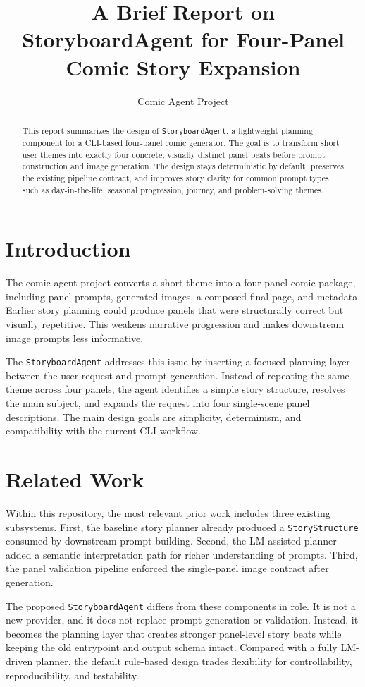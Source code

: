 \documentclass[11pt]{article}
\title{\textbf{A Brief Report on StoryboardAgent for Four-Panel Comic Story Expansion}}
\author{Comic Agent Project}
\date{}
\begin{document}
\maketitle

\begin{abstract}
This report summarizes the design of \texttt{StoryboardAgent}, a lightweight planning component for a CLI-based four-panel comic generator. The goal is to transform short user themes into exactly four concrete, visually distinct panel beats before prompt construction and image generation. The design stays deterministic by default, preserves the existing pipeline contract, and improves story clarity for common prompt types such as day-in-the-life, seasonal progression, journey, and problem-solving themes.
\end{abstract}

\section{Introduction}
The comic agent project converts a short theme into a four-panel comic package, including panel prompts, generated images, a composed final page, and metadata. Earlier story planning could produce panels that were structurally correct but visually repetitive. This weakens narrative progression and makes downstream image prompts less informative.

The \texttt{StoryboardAgent} addresses this issue by inserting a focused planning layer between the user request and prompt generation. Instead of repeating the same theme across four panels, the agent identifies a simple story structure, resolves the main subject, and expands the request into four single-scene panel descriptions. The main design goals are simplicity, determinism, and compatibility with the current CLI workflow.

\section{Related Work}
Within this repository, the most relevant prior work includes three existing subsystems. First, the baseline story planner already produced a \texttt{StoryStructure} consumed by downstream prompt building. Second, the LM-assisted planner added a semantic interpretation path for richer understanding of prompts. Third, the panel validation pipeline enforced the single-panel image contract after generation.

The proposed \texttt{StoryboardAgent} differs from these components in role. It is not a new provider, and it does not replace prompt generation or validation. Instead, it becomes the planning layer that creates stronger panel-level story beats while keeping the old entrypoint and output schema intact. Compared with a fully LM-driven planner, the default rule-based design trades flexibility for controllability, reproducibility, and testability.
\end{document}
